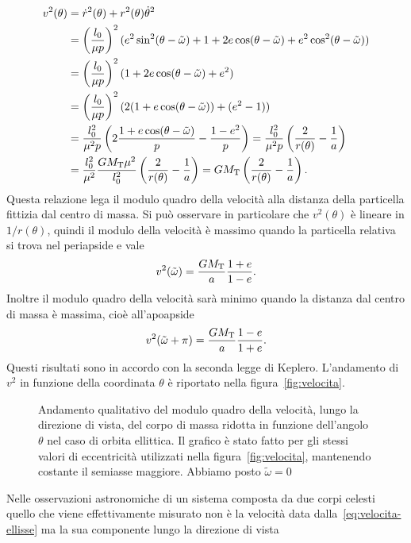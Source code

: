 \begin{equation}
  \label{eq:velocita-ellisse}
  \begin{split}
    v^2(\theta) &= \dot{r}^2(\theta) + r^2(\theta)\dot{\theta}^2 \\
    &= \left(
      \frac{l_0}{\mu p}
    \right)^2(e^2\sin^2(\theta-\tilde\omega) + 1 + 2e\cos(\theta-\tilde\omega) +
    e^2\cos^2(\theta-\tilde\omega)) \\
    &= \left(
      \frac{l_0}{\mu p}
    \right)^2(1+2e\cos(\theta-\tilde\omega)+e^2) \\
    &= \left(
      \frac{l_0}{\mu p}
    \right)^2(2(1+e\cos(\theta-\tilde\omega)) + (e^2-1)) \\
    &= \frac{l_0^2}{\mu^2p}
    \left(
      2\frac{1+e\cos(\theta-\tilde\omega)}{p} - \frac{1-e^2}{p}
    \right) = \frac{l_0^2}{\mu^2 p}
    \left(
      \frac{2}{r(\theta)} - \frac{1}{a}
    \right) \\
    &= \frac{l_0^2}{\mu^2}\frac{GM_\textup{T}\mu^2}{l_0^2}
    \left(
      \frac{2}{r(\theta)} - \frac{1}{a}
    \right) = GM_\textup{T}
    \left(
      \frac{2}{r(\theta)} - \frac{1}{a}
    \right).
  \end{split}
\end{equation}
Questa relazione lega il modulo quadro della velocità alla distanza della
particella fittizia dal centro di massa. Si può osservare in particolare che
$v^2(\theta)$ è lineare in $1/r(\theta)$, quindi il modulo della velocità è
massimo quando la particella relativa si trova nel periapside e vale
\begin{equation}
  v^2(\tilde\omega) = \frac{GM_\textup{T}}{a}\frac{1+e}{1-e}.
\end{equation}
Inoltre il modulo quadro della velocità sarà minimo quando la distanza dal
centro di massa è massima, cioè all'apoapside
\begin{equation}
  v^2(\tilde\omega+\pi) = \frac{GM_\textup{T}}{a}\frac{1-e}{1+e}.
\end{equation}
Questi risultati sono in accordo con la seconda legge di Keplero. L'andamento di
$v^2$ in funzione della coordinata $\theta$ è riportato nella
figura~\ref{fig:velocita}.

\begin{figure}
  \centering
  
  \caption[Andamento della velocità nella direzione di vista]{Andamento
    qualitativo del modulo quadro della velocità, lungo la direzione di vista,
    del corpo di massa ridotta in funzione dell'angolo $\theta$ nel caso di
    orbita ellittica. Il grafico è stato fatto per gli stessi valori di
    eccentricità utilizzati nella figura~\ref{fig:velocita}, mantenendo costante
    il semiasse maggiore. Abbiamo posto $\tilde\omega=0$}
  \label{fig:velocita-los}
\end{figure}
Nelle osservazioni astronomiche di un sistema composta da due corpi celesti
quello che viene effettivamente misurato non è la velocità data
dalla~\eqref{eq:velocita-ellisse} ma la sua componente lungo la direzione di
vista %

